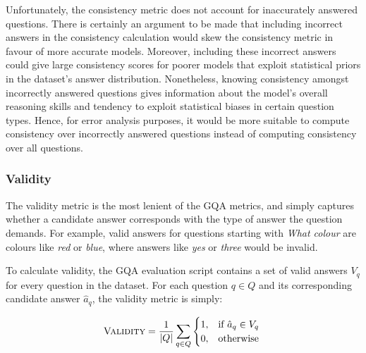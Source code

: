 
Unfortunately, the consistency metric does not account for inaccurately answered questions. There is certainly an argument to be made that including incorrect answers in the consistency calculation would skew the consistency metric in favour of more accurate models. Moreover, including these incorrect answers could give large consistency scores for poorer models that exploit statistical priors in the dataset's answer distribution.
Nonetheless, knowing consistency amongst incorrectly answered questions gives information about the model's overall reasoning skills and tendency to exploit statistical biases in certain question types. Hence, for error analysis purposes, it would be more suitable to compute consistency over incorrectly answered questions instead of computing consistency over all questions.


\subsubsection{Validity}

The validity metric is the most lenient of the GQA metrics, and simply captures whether a candidate answer corresponds with the type of answer the question demands. For example, valid answers for questions starting with \textit{What colour} are colours like \textit{red} or \textit{blue}, where answers like \textit{yes} or \textit{three} would be invalid.

To calculate validity, the GQA evaluation script \cite{hudson2019evaluation_script} contains a set of valid answers \(V_q\) for every question in the dataset. For each question \(q \in Q\) and its corresponding candidate answer \(\hat{a}_q\), the validity metric is simply:

\begin{equation}
    \textsc{Validity} = \frac{1}{|Q|}\sum_{q \in Q} \begin{cases}
        1, &\text{if } \hat{a}_q \in V_q\\
        0, &\text{otherwise }\\
    \end{cases}
    \label{equation:validity}
\end{equation}


